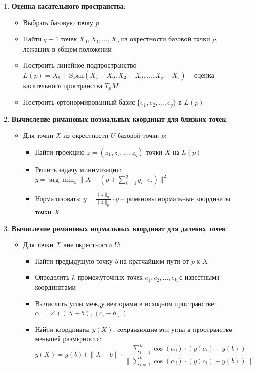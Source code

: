 \documentclass[a4paper,12pt]{article}
\begin{document}
\begin{enumerate}
    \item \textbf{Оценка касательного пространства}:
    \begin{itemize}
        \item Выбрать базовую точку $p$
        \item Найти $q+1$ точек $X_0, X_1, \ldots, X_q$ из окрестности базовой точки $p$, лежащих в общем положении
        \item Построить линейное подпространство $L(p) = X_0 + \text{Span}(X_1 - X_0, X_2 - X_0, \ldots, X_q - X_0)$ -- оценка касательного пространства $T_pM$
        \item Построить ортонормированный базис $\{e_1, e_2, \ldots, e_q\}$ в $L(p)$
    \end{itemize}

    \item \textbf{Вычисление римановых нормальных координат для близких точек}:
    \begin{itemize}
        \item Для точки $X$ из окрестности $U$ базовой точки $p$:
        \begin{itemize}
            \item Найти проекцию $z = (z_1, z_2, \ldots, z_q)$ точки $X$ на $L(p)$
            \item Решить задачу минимизации: $y = \arg\min_y \|X - (p + \sum_{i=1}^q y_i \cdot e_i)\|^2$
            \item Нормализовать: $y = \frac{\|z\|_q}{\|z\|_p} \cdot y$ -- римановы нормальные координаты точки $X$
        \end{itemize}
    \end{itemize}

    \item \textbf{Вычисление римановых нормальных координат для далеких точек}:
    \begin{itemize}
        \item Для точки $X$ вне окрестности $U$:
        \begin{itemize}
            \item Найти предыдущую точку $b$ на кратчайшем пути от $p$ к $X$
            \item Определить $k$ промежуточных точек $c_1, c_2, \ldots, c_k$ с известными координатами
            \item Вычислить углы между векторами в исходном пространстве: $\alpha_i = \angle((X-b), (c_i-b))$
            \item Найти координаты $y(X)$, сохраняющие эти углы в пространстве меньшей размерности:
            \begin{equation}
                y(X) = y(b) + \|X-b\| \cdot \frac{\sum_{i=1}^k \cos(\alpha_i) \cdot (y(c_i) - y(b))}{\|\sum_{i=1}^k \cos(\alpha_i) \cdot (y(c_i) - y(b))\|}
            \end{equation}
        \end{itemize}
    \end{itemize}
\end{enumerate}
\end{document}

